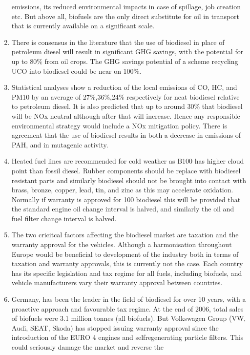 \documentclass[11pt,fleqn,oneside]{book} %
\begin{document}
\begin{enumerate}
	emissions, its reduced environmental impacts in case of spillage, job creation etc. But
	above all, biofuels are the only direct substitute for oil in transport that is currently
	available on a significant scale.
	\item There is consensus in the literature that the use of biodiesel in place of petroleum diesel
	will result in significant GHG savings, with the potential for up to 80\% from oil crops. The
	GHG savings potential of a scheme recycling UCO into biodiesel could be near on 100\%.
	\item Statistical analyses show a reduction of the local emissions of CO, HC, and PM10 by an
	average of 27\%,36\%,24\% respectively for neat biodiesel relative to petroleum diesel. It is
	also predicted that up to around 30\% that biodiesel will be NOx neutral although after that
	will increase. Hence any responsible environmental strategy would include a NOx
	mitigation policy. There is agreement that the use of biodiesel results in both a decrease
	in emissions of PAH, and in mutagenic activity.
	\item Heated fuel lines are recommended for cold weather as B100 has higher cloud point than
	fossil diesel. Rubber components should be replace with biodiesel resistant parts and
	similarly biodiesel should not be brought into contact with brass, bronze, copper, lead, tin,
	and zinc as this may accelerate oxidation. Normally if warranty is approved for 100%
	biodiesel this will be provided that the standard engine oil change interval is halved, and
	similarly the oil and fuel filter change interval is halved.
	\item The two cricitcal factors affecting the biodiesel market are taxation and the warranty
	approval for the vehicles. Although a harmonisation throughout Europe would be
	beneficial to development of the industry both in terms of taxation and warranty
	approvals, this is currently not the case. Each country has its specific legislation and tax
	regime for all fuels, including biofuels, and vehicle manufacturers vary their warranty
	approval between countries.
	\item Germany, has been the leader in the field of biodiesel for over 10 years, with a proactive
	approach and favourable tax regime. At the end of 2006, total sales of biofuels were 3.1
	million tonnes (all biofuels). But Volkswagen Group (VW, Audi, SEAT, Skoda) has
	stopped issuing warranty approval since the introduction of the EURO 4 engines and selfregenerating
	particle filters. This could seriously damage the market and reverse the

\end{enumerate}
\end{document}
